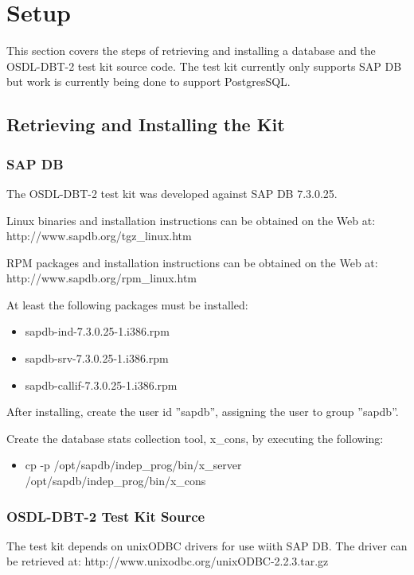 \documentclass{article}
\begin{document}
\section{Setup}

This section covers the steps of retrieving and installing a database and the
OSDL-DBT-2 test kit source code.  The test kit currently only supports SAP DB
but work is currently being done to support PostgresSQL.

\subsection{Retrieving and Installing the Kit}

\subsubsection{SAP DB}

The OSDL-DBT-2 test kit was developed against SAP DB 7.3.0.25.

Linux binaries and installation instructions can be obtained on the Web at:
http://www.sapdb.org/tgz\_linux.htm

RPM packages and installation instructions can be obtained on the Web at:
http://www.sapdb.org/rpm\_linux.htm

At least the following packages must be installed:
\begin{itemize}
\item sapdb-ind-7.3.0.25-1.i386.rpm
\item sapdb-srv-7.3.0.25-1.i386.rpm
\item sapdb-callif-7.3.0.25-1.i386.rpm
\end{itemize}

After installing, create the user id ''sapdb'', assigning the user to group
''sapdb''.

Create the database stats collection tool, x\_cons, by executing the
following:
\begin{itemize}
\item cp -p /opt/sapdb/indep\_prog/bin/x\_server
      /opt/sapdb/indep\_prog/bin/x\_cons
\end{itemize}

\subsubsection{OSDL-DBT-2 Test Kit Source}

The test kit depends on unixODBC drivers for use wiith SAP DB.  The driver
can be retrieved at: http://www.unixodbc.org/unixODBC-2.2.3.tar.gz
\end{document}
